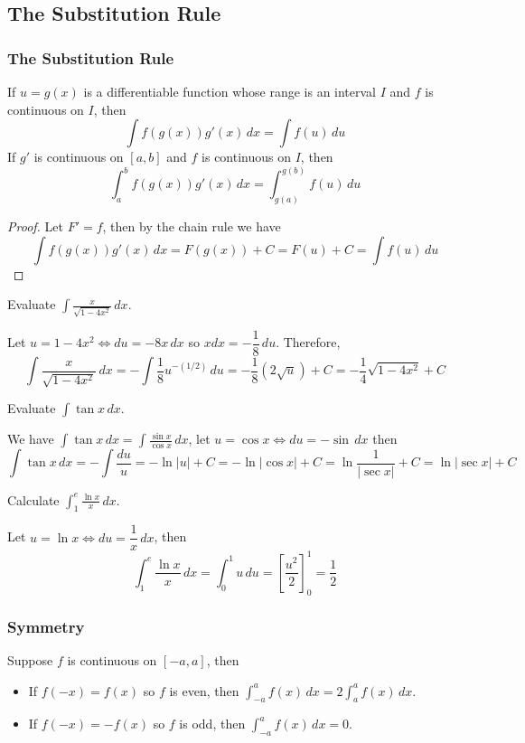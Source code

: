 \subsection{The Substitution Rule}

\subsubsection*{The Substitution Rule}
\begin{theorem}
    If \(u=g(x)\) is a differentiable function whose range is an interval
    \(I\) and \(f\) is continuous on \(I\), then
    \[\int f(g(x))g'(x)\,dx=\int f(u)\,du\]
    If \(g'\) is continuous on \([a,b]\) and \(f\) is continuous on \(I\),
    then
    \[\int_a^b f(g(x))g'(x)\,dx=\int_{g(a)}^{g(b)} f(u)\,du\]
\end{theorem}
\begin{proof}
    Let \(F'=f\), then by the chain rule we have
    \[\int f(g(x))g'(x)\,dx=F(g(x))+C=F(u)+C=\int f(u)\,du\]
\end{proof}
\begin{problem}
    Evaluate \(\displaystyle{\int\frac{x}{\sqrt{1-4x^2}}\,dx}\).
\end{problem}
\begin{solution}
    Let \(u=1-4x^2\iff du=-8x\,dx\) so \(xdx=-\dfrac{1}{8}\,du\).
    Therefore,
    \[\int\frac{x}{\sqrt{1-4x^2}}\,dx=-\int\frac{1}{8}u^{-(1/2)}\,du
    =-\frac{1}{8}(2\sqrt{u})+C=-\frac{1}{4}\sqrt{1-4x^2}+C\]
\end{solution}
\begin{problem}
    Evaluate \(\displaystyle{\int\tan x\,dx}\).
\end{problem}
\begin{solution}
    We have \(\displaystyle{\int\tan x\,dx=\int\frac{\sin x}{\cos x}}\,dx\),
    let \(u=\cos x \iff du=-\sin\,dx\) then
    \[\int\tan x\,dx=-\int\frac{du}{u}=-\ln|u|+C=-\ln|\cos x|+C
    =\ln\frac{1}{|\sec x|}+C=\ln|\sec x|+C\]
\end{solution}
\begin{problem}
    Calculate \(\displaystyle{\int_1^e \frac{\ln x}{x}\,dx}\).
\end{problem}
\begin{solution}
    Let \(u=\ln x\iff du=\dfrac{1}{x}\,dx\), then
    \[\int_1^e \frac{\ln x}{x}\,dx=\int_0^1 u\,du
    =\left[\frac{u^2}{2}\right]_0^1=\frac{1}{2}\]
\end{solution}

\subsubsection*{Symmetry}
\begin{theorem}
    Suppose \(f\) is continuous on \([-a,a]\), then
    \begin{itemize}
        \item If \(f(-x)=f(x)\) so \(f\) is even, then
        \(\displaystyle{\int_{-a}^a f(x)\,dx=2\int_a^a f(x)\,dx}\).
        \item If \(f(-x)=-f(x)\) so \(f\) is odd, then
        \(\displaystyle{\int_{-a}^a f(x)\,dx=0}\).
    \end{itemize}
\end{theorem}